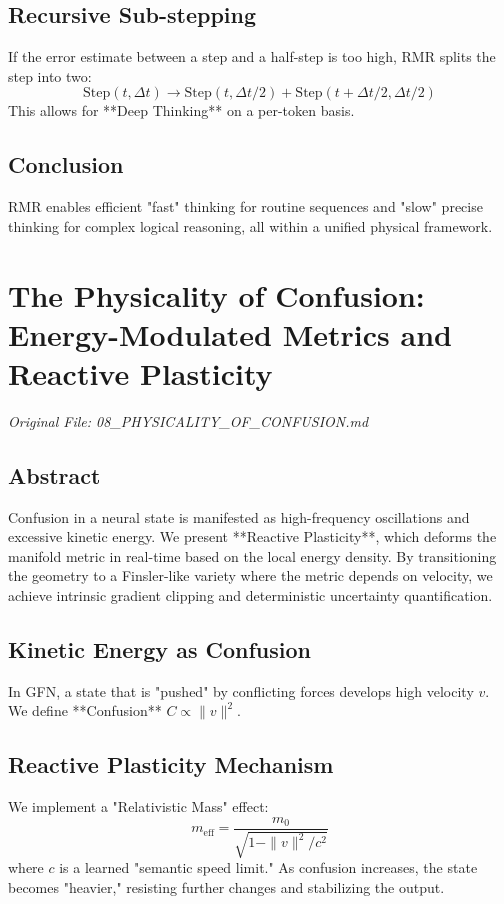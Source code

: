 \documentclass[11pt,a4paper]{report}
\begin{document}
\section{Recursive Sub-stepping}
If the error estimate between a step and a half-step is too high, RMR splits the step into two:
\begin{equation}
    \text{Step}(t, \Delta t) \to \text{Step}(t, \Delta t/2) + \text{Step}(t + \Delta t/2, \Delta t/2)
\end{equation}
This allows for **Deep Thinking** on a per-token basis.

\section{Conclusion}
RMR enables efficient "fast" thinking for routine sequences and "slow" precise thinking for complex logical reasoning, all within a unified physical framework.

\chapter{The Physicality of Confusion: Energy-Modulated Metrics and Reactive Plasticity}
\textit{Original File: 08\_PHYSICALITY\_OF\_CONFUSION.md}

\section{Abstract}
Confusion in a neural state is manifested as high-frequency oscillations and excessive kinetic energy. We present **Reactive Plasticity**, which deforms the manifold metric in real-time based on the local energy density. By transitioning the geometry to a Finsler-like variety where the metric depends on velocity, we achieve intrinsic gradient clipping and deterministic uncertainty quantification.

\section{Kinetic Energy as Confusion}
In GFN, a state that is "pushed" by conflicting forces develops high velocity $v$. We define **Confusion** $C \propto \|v\|^2$.

\section{Reactive Plasticity Mechanism}
We implement a "Relativistic Mass" effect:
\begin{equation}
    m_{\text{eff}} = \frac{m_0}{\sqrt{1 - \|v\|^2/c^2}}
\end{equation}
where $c$ is a learned "semantic speed limit." As confusion increases, the state becomes "heavier," resisting further changes and stabilizing the output.
\end{document}

